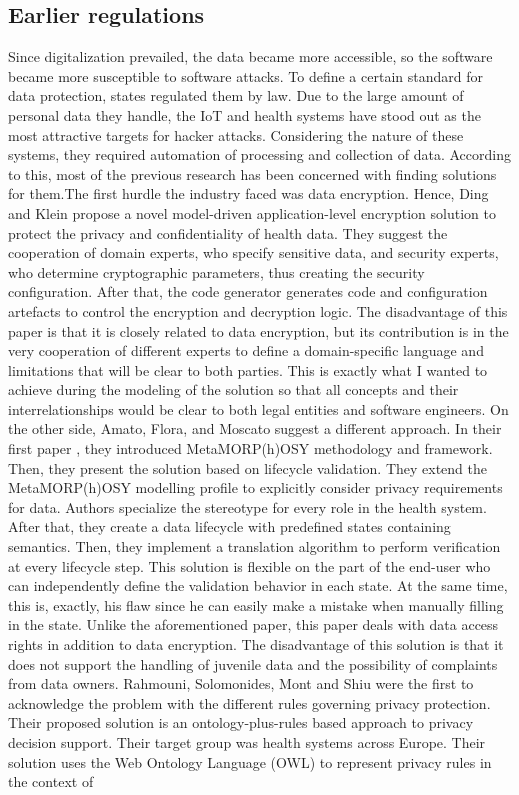 \documentclass[11pt,english]{article}
\begin{document}
\subsection{Earlier regulations}
Since digitalization prevailed, the data became more accessible, so the software became more susceptible to software attacks. To define a certain standard for data protection, states regulated them by law. Due to the large amount of personal data they handle, the IoT \cite{iot} and health systems have stood out as the most attractive targets for hacker attacks. Considering the nature of these systems, they required automation of processing and collection of data. According to this, most of the previous research has been concerned with finding solutions for them.\newline The first hurdle the industry faced was data encryption. Hence, Ding and Klein \cite{encryptionLevel} propose a novel model-driven application-level encryption solution to protect the privacy and confidentiality of health data. They suggest the cooperation of domain experts, who specify sensitive data, and security experts, who determine cryptographic parameters, thus creating the security configuration. After that, the code generator generates code and configuration artefacts to control the encryption and decryption logic. The disadvantage of this paper is that it is closely related to data encryption, but its contribution is in the very cooperation of different experts to define a domain-specific language and limitations that will be clear to both parties. This is exactly what I wanted to achieve during the modeling of the solution so that all concepts and their interrelationships would be clear to both legal entities and software engineers. On the other side, Amato, Flora, and Moscato suggest a different approach. In their first paper \cite{6245777}, they introduced MetaMORP(h)OSY methodology and framework. Then, they present the solution \cite{amato2015model} based on lifecycle validation. They extend the MetaMORP(h)OSY modelling profile to explicitly consider privacy requirements for data. Authors specialize the stereotype for every role in the health system. After that, they create a data lifecycle with predefined states containing semantics. Then, they implement a translation algorithm to perform verification at every lifecycle step. This solution is flexible on the part of the end-user who can independently define the validation behavior in each state. At the same time, this is, exactly, his flaw since he can easily make a mistake when manually filling in the state. Unlike the aforementioned paper, this paper deals with data access rights in addition to data encryption. The disadvantage of this solution is that it does not support the handling of juvenile data and the possibility of complaints from data owners. \newline Rahmouni, Solomonides, Mont and Shiu \cite{rahmouni2011model} were the first to acknowledge the problem with the different rules governing privacy protection. Their proposed solution is an ontology-plus-rules based approach to privacy decision support. Their target group was health systems across Europe. Their solution uses the Web Ontology Language (OWL) \cite{owl} to represent privacy rules in the context of 
\end{document}
